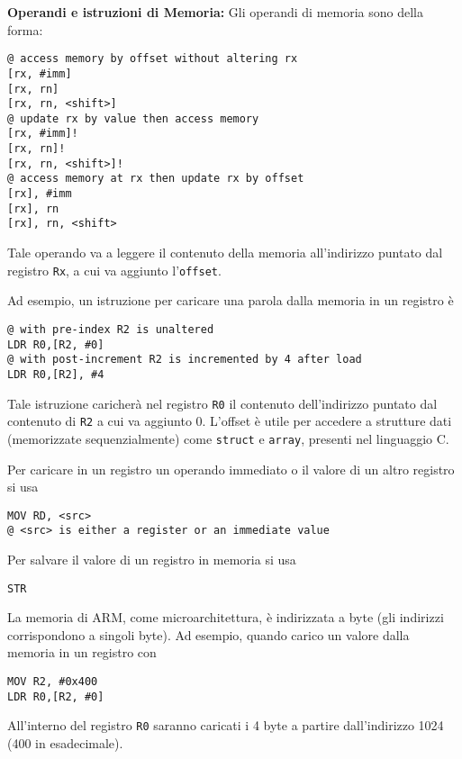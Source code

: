 \begin{defn}
\textbf{Operandi e istruzioni di Memoria:}
Gli operandi di memoria sono della forma:
\begin{lstlisting}[style=arm]
@ access memory by offset without altering rx
[rx, #imm]
[rx, rn]
[rx, rn, <shift>]
@ update rx by value then access memory
[rx, #imm]!
[rx, rn]!
[rx, rn, <shift>]!
@ access memory at rx then update rx by offset
[rx], #imm
[rx], rn
[rx], rn, <shift>
\end{lstlisting}

Tale operando va a leggere il contenuto della memoria all'indirizzo puntato dal registro \verb|Rx|, a cui va aggiunto l'\verb|offset|.

Ad esempio, un istruzione per caricare una parola dalla memoria in un registro è
\begin{lstlisting}[style=arm]
@ with pre-index R2 is unaltered
LDR R0,[R2, #0]
@ with post-increment R2 is incremented by 4 after load
LDR R0,[R2], #4
\end{lstlisting}

Tale istruzione caricherà nel registro \verb|R0| il contenuto dell'indirizzo puntato dal contenuto di \verb|R2| a cui va aggiunto 0. L'offset è utile per accedere a strutture dati (memorizzate sequenzialmente) come \verb|struct| e \verb|array|, presenti nel linguaggio C.

Per caricare in un registro un operando immediato o il valore di un altro registro si usa
\begin{lstlisting}[style=arm]
MOV RD, <src>
@ <src> is either a register or an immediate value
\end{lstlisting}

Per salvare il valore di un registro in memoria si usa
\begin{lstlisting}[style=arm]
STR
\end{lstlisting}
\end{defn}

\begin{note}
La memoria di ARM, come microarchitettura, è indirizzata a byte (gli indirizzi corrispondono a singoli byte). Ad esempio, quando carico un valore dalla memoria in un registro con
\begin{lstlisting}[style=arm]
MOV R2, #0x400
LDR R0,[R2, #0]
\end{lstlisting}

All'interno del registro \verb|R0| saranno caricati i 4 byte a partire dall'indirizzo 1024 (400 in esadecimale).
\end{note}

